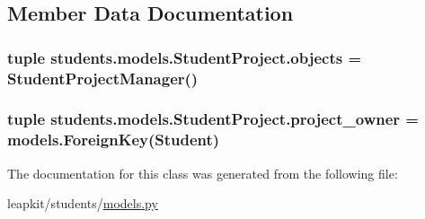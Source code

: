 \subsection{Member Data Documentation}
\hypertarget{classstudents_1_1models_1_1_student_project_ae8b085624144ff16a10d16c43804db51}{
\subsubsection[{objects}]{\setlength{\rightskip}{0pt plus 5cm}tuple students.\-models.\-Student\-Project.\-objects = {\bf Student\-Project\-Manager}()\hspace{0.3cm}{\ttfamily [static]}}}\label{classstudents_1_1models_1_1_student_project_ae8b085624144ff16a10d16c43804db51}
\hypertarget{classstudents_1_1models_1_1_student_project_a5ba7a623e161f3bc7301273b479c34aa}{
\subsubsection[{project\-\_\-owner}]{\setlength{\rightskip}{0pt plus 5cm}tuple students.\-models.\-Student\-Project.\-project\-\_\-owner = models.\-Foreign\-Key({\bf Student})\hspace{0.3cm}{\ttfamily [static]}}}\label{classstudents_1_1models_1_1_student_project_a5ba7a623e161f3bc7301273b479c34aa}


The documentation for this class was generated from the following file\-:\begin{DoxyCompactItemize}
\item 
leapkit/students/\hyperlink{models_8py}{models.\-py}\end{DoxyCompactItemize}
